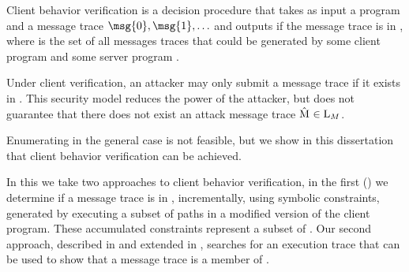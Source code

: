 \begin{definition}
  Client behavior verification is a decision procedure that takes as input a
  program \program{} and a message trace $\msg{0},
  \msg{1}, \ldots$ \msg{\msgNmbr} and outputs
  if the message trace \messageTrace{\msgNmbr} is in
  \msgLang{\program{}},
  where \msgLang{\program{}} is the set of all messages
  traces that could be generated by some client program \program{}
  and some server program \server{}.
\end{definition}

Under client verification, an attacker may only submit a message trace
if it exists in \msgLang{\program}. This security
model reduces the power of the attacker, but does not guarantee that
there does not exist an attack message trace $\mathrm{\hat{M}_{}} \in
\mathrm{L}_{M}$.

Enumerating \msgLang{\program{}} in the general case is not feasible, but we show in this
dissertation that client behavior verification can be achieved.

In this \dissertation we take two approaches to client behavior
verification, in the first () we determine if a message
trace is in \msgLang{\program}, incrementally, using symbolic
constraints, generated by executing a subset of paths in a modified
version of the client program. These accumulated constraints represent
a subset of \msgLang{\program}. Our second approach, described in
 and extended in , searches for an
execution trace \execTrace{} that can be used to show that a message
trace is a member of \msgLang{\program}.


